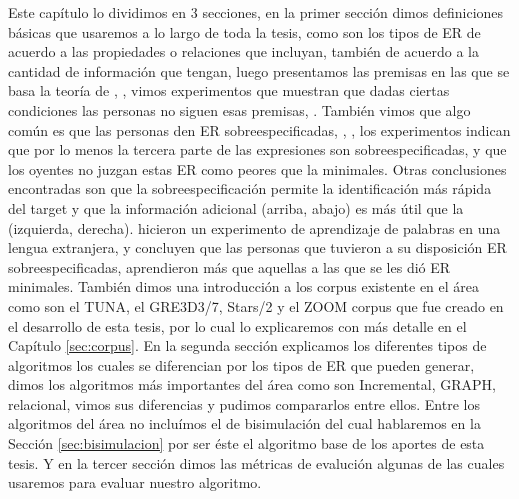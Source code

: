 Este cap\'itulo lo dividimos en 3 secciones, en la primer secci\'on dimos definiciones b\'asicas que usaremos a lo largo de toda la tesis, como son los tipos de ER de acuerdo a las propiedades o relaciones que incluyan, tambi\'en de acuerdo a la cantidad de informaci\'on que tengan, luego presentamos las premisas en las que se basa la teor\'ia de \cite{clark1992arenas}, \cite{Clark-Marshall81}, vimos experimentos que muestran que dadas ciertas condiciones las personas no siguen esas premisas, \cite{keysar:Curr98}. Tambi\'en vimos que algo com\'un es que las personas den ER sobreespecificadas, \cite{arts}, \cite{do-speakers}, los experimentos indican que por lo menos la tercera parte de las expresiones son sobreespecificadas, y que los oyentes no juzgan estas ER como peores que la minimales. Otras conclusiones encontradas son que la sobreespecificaci\'on permite la identificaci\'on m\'as r\'apida del target y que la informaci\'on adicional (arriba, abajo) es m\'as \'util que la (izquierda, derecha). \cite{Lu_sasha2015} hicieron un experimento de aprendizaje de palabras en una lengua extranjera, y concluyen que las personas que tuvieron a su disposici\'on ER sobreespecificadas, aprendieron m\'as que aquellas a las que se les di\'o ER minimales. Tambi\'en dimos una introducci\'on a los corpus existente en el \'area como son el TUNA, el GRE3D3/7, Stars/2 y el ZOOM corpus que fue creado en el desarrollo de esta tesis, por lo cual lo explicaremos con m\'as detalle en el Cap\'itulo \ref{sec:corpus}. En la segunda secci\'on explicamos los diferentes tipos de algoritmos los cuales se diferencian por los tipos de ER que pueden generar, dimos los algoritmos m\'as importantes del \'area como son Incremental, GRAPH, relacional, vimos sus diferencias y pudimos compararlos entre ellos. Entre los algoritmos del \'area no inclu\'imos el de bisimulaci\'on del cual hablaremos en la Secci\'on \ref{sec:bisimulacion} por ser \'este el algoritmo base de los aportes de esta tesis. Y en la tercer secci\'on dimos las m\'etricas de evaluci\'on algunas de las cuales usaremos para evaluar nuestro algoritmo.

